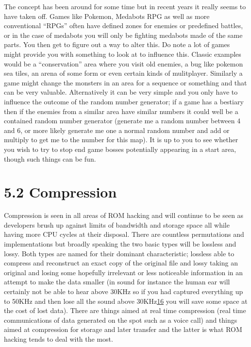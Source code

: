 \documentclass[
]{book}
\begin{document}
The concept has been around for some time but in recent years it really seems to have taken off. Games like Pokemon, Medabots RPG as well as more conventional ``RPGs'' often have defined zones for enemies or predefined battles, or in the case of medabots you will only be fighting medabots made of the same parts. You then get to figure out a way to alter this. Do note a lot of games might provide you with something to look at to influence this. Classic examples would be a ``conservation'' area where you visit old enemies, a bug like pokemon sea tiles, an arena of some form or even certain kinds of mulitplayer. Similarly a game might change the monsters in an area for a sequence or something and that can be very valuable. Alternatively it can be very simple and you only have to influence the outcome of the random number generator; if a game has a bestiary then if the enemies from a similar area have similar numbers it could well be a contained random number generator (generate me a random number between 4 and 6, or more likely generate me one a normal random number and add or multiply to get me to the number for this map). It is up to you to see whether you wish to try to stop end game bosses potentially appearing in a start area, though such things can be fun.

\hypertarget{compression-1}{%
\section{5.2 Compression}\label{compression-1}}

Compression is seen in all areas of ROM hacking and will continue to be seen as developers brush up against limits of bandwidth and storage space all while having more CPU cycles at their disposal. There are countless permutations and implementations but broadly speaking the two basic types will be lossless and lossy. Both types are named for their dominant characteristic; lossless able to compress and reconstruct an exact copy of the original file and lossy taking an original and losing some hopefully irrelevant or less noticeable information in an attempt to make the data smaller (in sound for instance the human ear will certainly not be able to hear above 30KHz so if you had captured everything up to 50KHz and then lose all the sound above 30KHz\href{romhacking202017.html\#fn16x0}{16} you will save some space at the cost of lost data). There are things aimed at real time compression (real time communications of data generated on the spot such as a voice call) and things aimed at compression for storage and later transfer and the latter is what ROM hacking tends to deal with the most.
\end{document}
